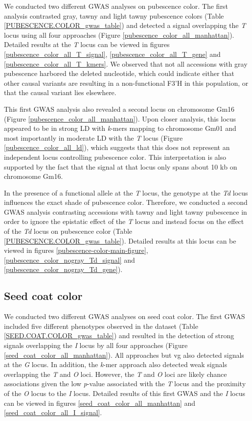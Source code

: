 We conducted two different GWAS analyses on pubescence color. The first analysis
contrasted gray, tawny and light tawny pubescence colors (Table
\ref{PUBESCENCE.COLOR_gwas_table}) and detected a signal overlapping the
\emph{T} locus using all four approaches (Figure
\ref{pubescence_color_all_manhattan}). Detailed results at the \textit{T} locus
can be viewed in figures \ref{pubescence_color_all_T_signal},
\ref{pubescence_color_all_T_gene} and \ref{pubescence_color_all_T_kmers}. We
observed that not all accessions with gray pubescence harbored the deleted
nucleotide, which could indicate either that other causal variants are resulting in
a non-functional F3’H in this population, or that the causal
variant lies elsewhere.

This first GWAS analysis also revealed a second locus on chromosome Gm16
(Figure \ref{pubescence_color_all_manhattan}). Upon closer analysis, this locus
appeared to be in strong LD with \emph{k}-mers mapping to chromosome Gm01 and
most importantly in moderate LD with the \emph{T} locus (Figure
\ref{pubescence_color_all_ld}), which suggests that this does not represent an
independent locus controlling pubescence color. This interpretation is also
supported by the fact that the signal at that locus only spans about 10 kb on
chromosome Gm16.

In the presence of a functional allele at the \emph{T} locus, the genotype at
the \emph{Td} locus influences the exact shade of pubescence color.  Therefore,
we conducted a second GWAS analysis contrasting accessions with tawny and light
tawny pubescence in order to ignore the epistatic effect of the \emph{T} locus
and instead focus on the effect of the \emph{Td} locus on pubescence color
(Table \ref{PUBESCENCE.COLOR_gwas_table}). Detailed results at this locus
can be viewed in figures \ref{pubescence-color-main-figure}, \ref{pubescence_color_nogray_Td_signal} and
\ref{pubescence_color_nogray_Td_gene}). 

\subsection*{Seed coat color}
\label{sv-gwas-seed-coat-color}

We conducted two different GWAS analyses on seed coat color. The first GWAS
included five different phenotypes observed in the dataset (Table
\ref{SEED.COAT.COLOR_gwas_table}) and resulted in the detection of strong
signals overlapping the \emph{I} locus by all four approaches (Figure
\ref{seed_coat_color_all_manhattan}). All approaches but vg also detected
signals at the \emph{G} locus. In addition, the \emph{k}-mer approach also
detected weak signals overlapping the \emph{T} and \emph{O} loci. However, the
\emph{T} and \emph{O} loci are likely chance associations given the low \textit{p}-value
associated with the \emph{T} locus and the proximity of the \emph{O} locus to
the \emph{I} locus. Detailed results of this first GWAS and the \textit{I}
locus can be viewed in figures \ref{seed_coat_color_all_manhattan} and
\ref{seed_coat_color_all_I_signal}.

